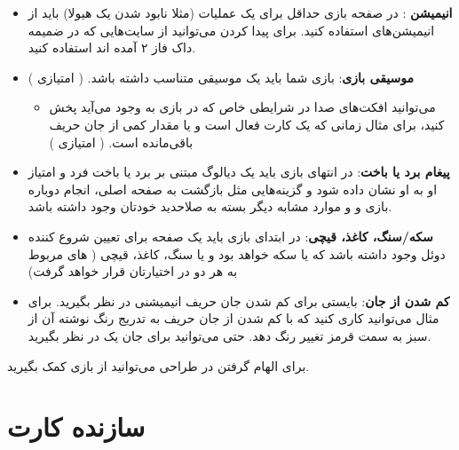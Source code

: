 \documentclass[]{article}
\begin{document}
\begin{itemize}
    \item \textbf{انیمیشن }: در صفحه بازی حداقل برای یک عملیات (مثلا نابود شدن یک هیولا) باید از انیمیشن‌های  استفاده کنید. برای پیدا کردن  می‌توانید از سایت‌هایی که در ضمیمه داک فاز ۲ آمده اند استفاده کنید.
    \item \textbf{موسیقی بازی}: بازی شما باید یک موسیقی متناسب داشته باشد. ( امتیازی ) 
    \begin{itemize}
        \item می‌توانید افکت‌های صدا در شرایطی خاص که در بازی به وجود می‌آید پخش کنید، برای مثال زمانی که یک کارت  فعال است و یا مقدار کمی از جان حریف باقی‌مانده است. ( امتیازی‌ )
    \end{itemize}
    \item \textbf{پیغام برد یا باخت}: در انتهای بازی باید یک دیالوگ مبتنی بر برد یا باخت فرد و امتیاز او به او نشان داده شود و گزینه‌هایی مثل بازگشت به صفحه اصلی، انجام دوباره بازی و و موارد مشابه دیگر بسته به صلاحدید خودتان وجود داشته باشد.
    \item \textbf{سکه/سنگ، کاغذ، قیچی}: در ابتدای بازی باید یک صفحه برای تعیین شروع کننده دوئل وجود داشته باشد که یا سکه خواهد بود و یا سنگ‌، کاغذ، قیچی (  های مربوط به هر دو در اختیارتان قرار خواهد گرفت)
    \item \textbf{کم شدن از جان}: بایستی برای کم شدن جان حریف انیمیشنی در نظر بگیرید. برای مثال می‌توانید کاری کنید که با کم شدن از جان حریف به تدریج رنگ نوشته آن از سبز به سمت قرمز تغییر رنگ دهد. حتی می‌توانید برای جان یک  در نظر بگیرید.
\end{itemize}
برای الهام گرفتن در طراحی می‌توانید از بازی  کمک بگیرید.

\section*{{\titr سازنده کارت}}
\end{document}
